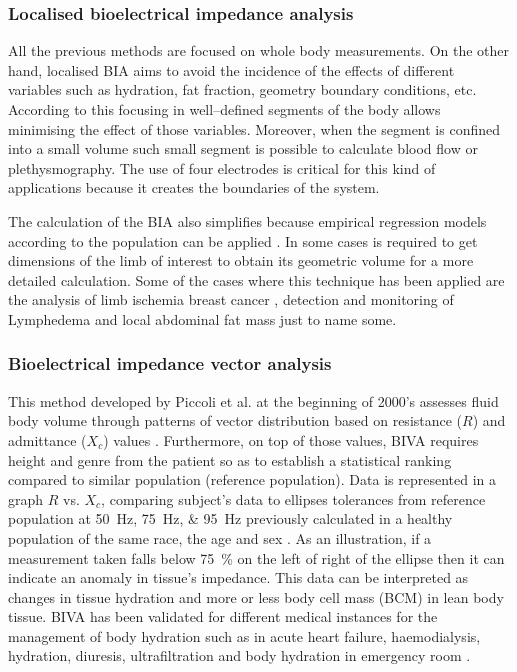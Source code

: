 \subsubsection{Localised bioelectrical impedance analysis}
All the previous methods are focused on whole body measurements. On the other hand, localised BIA aims to avoid the incidence of the effects of different variables such as hydration, fat fraction, geometry boundary conditions, etc. According to this focusing in well–defined segments of the body allows minimising the effect of those variables. Moreover, when the segment is confined into a small volume such small segment is possible to calculate blood flow or plethysmography. The use of four electrodes is critical for this kind of applications because it creates the boundaries of the system. 

The calculation of the BIA also simplifies because empirical regression models according to the population can be applied \cite{kyle2004bioelectrical}. In some cases is required to get dimensions of the limb of interest to obtain its geometric volume for a more detailed calculation.  Some of the cases where this technique has been applied are the analysis of limb ischemia \cite{songer2001tissue,kun1994tissue} breast cancer \cite{zou2003review}, detection and monitoring of Lymphedema \cite{vicini2012bioelectrical} and local abdominal fat mass \cite{scharfetter2001assessing} just to name some. 

\subsubsection{Bioelectrical impedance vector analysis}
This method developed by Piccoli et al. \cite{piccoli2000relationship, piccoli2002impedance} at the beginning of 2000’s assesses fluid body volume through patterns of vector distribution based on resistance ($R$) and admittance ($X_{c}$) values \cite{thomas2003comparison}. Furthermore, on top of those values, BIVA requires height and genre from the patient so as to establish a statistical ranking compared to similar population (reference population). Data is represented in a graph $R$ vs. $X_{c}$, comparing subject’s data to ellipses tolerances from reference population at \SIlist{50;75;95}{\hertz} previously calculated in a healthy population of the same race, the age and sex \cite{kyle2004bioelectrical,piccoli2000relationship, piccoli2002impedance}. As an illustration, if a measurement taken falls below \SI{75}{\percent} on the left of right of the ellipse then it can indicate an anomaly in tissue’s impedance. This data can be interpreted as changes in tissue hydration and more or less body cell mass (BCM) in lean body tissue. BIVA has been validated for different medical instances for the management of body hydration such as in acute heart failure, haemodialysis, hydration, diuresis, ultrafiltration and body hydration in emergency room \cite{disomma2011consensus}. 


